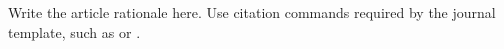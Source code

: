 Write the article rationale here. Use citation commands required by the journal template, such as \citep{example_key} or \citet{example_key}.

